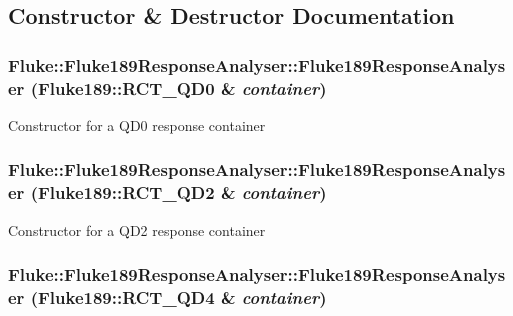 \subsection{Constructor \& Destructor Documentation}
\hypertarget{classFluke_1_1Fluke189ResponseAnalyser_af8443be8f2d94df431e9674ec8947ff1}{
\subsubsection[{Fluke189ResponseAnalyser}]{\setlength{\rightskip}{0pt plus 5cm}Fluke::Fluke189ResponseAnalyser::Fluke189ResponseAnalyser (Fluke189::RCT\_\-QD0 \& {\em container})}}
\label{classFluke_1_1Fluke189ResponseAnalyser_af8443be8f2d94df431e9674ec8947ff1}
Constructor for a QD0 response container \hypertarget{classFluke_1_1Fluke189ResponseAnalyser_a7f0525c67c93abf3f4dd4523be858d2c}{
\subsubsection[{Fluke189ResponseAnalyser}]{\setlength{\rightskip}{0pt plus 5cm}Fluke::Fluke189ResponseAnalyser::Fluke189ResponseAnalyser (Fluke189::RCT\_\-QD2 \& {\em container})}}
\label{classFluke_1_1Fluke189ResponseAnalyser_a7f0525c67c93abf3f4dd4523be858d2c}
Constructor for a QD2 response container \hypertarget{classFluke_1_1Fluke189ResponseAnalyser_aee4c6051258bc1f44659e15ea89df442}{
\subsubsection[{Fluke189ResponseAnalyser}]{\setlength{\rightskip}{0pt plus 5cm}Fluke::Fluke189ResponseAnalyser::Fluke189ResponseAnalyser (Fluke189::RCT\_\-QD4 \& {\em container})}}
\label{classFluke_1_1Fluke189ResponseAnalyser_aee4c6051258bc1f44659e15ea89df442}
